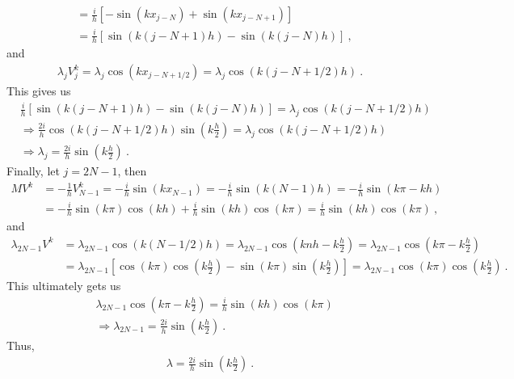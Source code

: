 \begin{questions}
\begin{solution}
\begin{align*}
&= \frac{i}{h}\left[-\sin\left(kx_{j-N}\right)+\sin\left(kx_{j-N+1}\right)\right] \\
& = \frac{i}{h}\left[\sin(k(j-N+1)h) - \sin(k(j-N)h)\right]~,
\end{align*}
and
\begin{align*}
\lambda_j V_j^k = \lambda_j\cos(kx_{j-N+1/2}) = \lambda_j \cos(k(j-N+1/2)h)~.
\end{align*}
This gives us
\begin{align*}
& \frac{i}{h}\left[\sin(k(j-N+1)h) - \sin(k(j-N)h)\right] = \lambda_j \cos(k(j-N+1/2)h) \\
& \Rightarrow \frac{2i}{h}\cos(k(j-N+1/2)h)\sin\left(k\frac{h}{2}\right) = \lambda_j \cos(k(j-N+1/2)h) \\
& \Rightarrow \lambda_j = \frac{2i}{h}\sin\left(k\frac{h}{2}\right)~.
\end{align*}
Finally, let $j= 2N-1$, then
\begin{align*}
MV^k & = -\frac{1}{h}V_{N-1}^k = -\frac{i}{h}\sin(kx_{N-1}) = -\frac{i}{h}\sin(k(N-1)h) = -\frac{i}{h}\sin(k\pi - kh) \\
& = -\frac{i}{h}\sin(k\pi)\cos(kh) + \frac{i}{h}\sin(kh)\cos(k\pi) = \frac{i}{h}\sin(kh)\cos(k\pi)~,
\end{align*}
and
\begin{align*}
\lambda_{2N-1}V^k &= \lambda_{2N-1}\cos(k(N-1/2)h) = \lambda_{2N-1}\cos\left(knh - k\frac{h}{2}\right) = \lambda_{2N-1}\cos\left(k\pi - k\frac{h}{2}\right) \\
& = \lambda_{2N-1}\left[\cos(k\pi)\cos\left(k\frac{h}{2}\right) - \sin(k\pi)\sin\left(k\frac{h}{2}\right)\right] = \lambda_{2N-1}\cos(k\pi)\cos\left(k\frac{h}{2}\right)~.
\end{align*}
This ultimately gets us
\begin{align*}
& \lambda_{2N-1}\cos\left(k\pi - k\frac{h}{2}\right) = \frac{i}{h}\sin(kh)\cos(k\pi) \\
& \Rightarrow \lambda_{2N-1} = \frac{2i}{h}\sin\left(k\frac{h}{2}\right)~.
\end{align*}
Thus,
\begin{align*}
\lambda= \frac{2i}{h}\sin\left(k\frac{h}{2}\right)~.
\end{align*}

\end{solution}

 

\end{questions}
